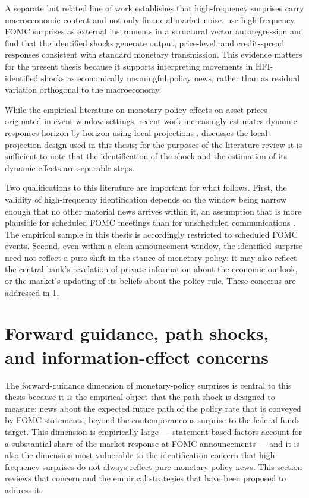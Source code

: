 A separate but related line of work establishes that high-frequency
surprises carry macroeconomic content and not only financial-market
noise. \citet{gertlerKaradi2015} use high-frequency FOMC surprises as
external instruments in a structural vector autoregression and find
that the identified shocks generate output, price-level, and credit-spread
responses consistent with standard monetary transmission. This evidence
matters for the present thesis because it supports interpreting movements
in HFI-identified shocks as economically meaningful policy news, rather
than as residual variation orthogonal to the macroeconomy.

While the empirical literature on monetary-policy effects on asset
prices originated in event-window settings, recent work increasingly
estimates dynamic responses horizon by horizon using local projections
\citep{jorda2005,jordaTaylor2025}.  discusses
the local-projection design used in this thesis; for the purposes of the
literature review it is sufficient to note that the identification of
the shock and the estimation of its dynamic effects are separable steps.

Two qualifications to this literature are important for what follows.
First, the validity of high-frequency identification depends on the
window being narrow enough that no other material news arrives within
it, an assumption that is more plausible for scheduled FOMC meetings
than for unscheduled communications \citep{gurkaynakSackSwanson2005}.
The empirical sample in this thesis is accordingly restricted to
scheduled FOMC events. Second, even within a clean announcement
window, the identified surprise need not reflect a pure shift in the
stance of monetary policy: it may also reflect the central bank's
revelation of private information about the economic outlook, or the
market's updating of its beliefs about the policy rule. These concerns
are addressed in \cref{sec:literature-forward-guidance}.

\section{Forward guidance, path shocks, and information-effect concerns}
\label{sec:literature-forward-guidance}

The forward-guidance dimension of monetary-policy surprises is central
to this thesis because it is the empirical object that the path shock
\citep{swanson2021} is designed to measure: news about the expected
future path of the policy rate that is conveyed by FOMC statements,
beyond the contemporaneous surprise to the federal funds target. This
dimension is empirically large --- statement-based factors account for
a substantial share of the market response at FOMC announcements
\citep{gurkaynakSackSwanson2005,swanson2021} --- and it is also the
dimension most vulnerable to the identification concern that high-frequency
surprises do not always reflect pure monetary-policy news. This section
reviews that concern and the empirical strategies that have been proposed
to address it.

